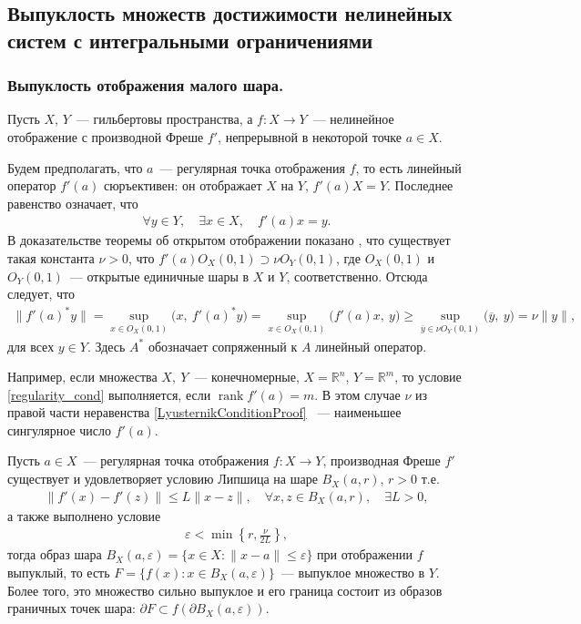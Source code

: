 \documentclass[../main.tex]{subfiles}
\begin{document}
	\subsection{Выпуклость множеств достижимости нелинейных систем с интегральными ограничениями}
	\subsubsection{Выпуклость отображения малого шара.}
	
	Пусть $X$, $Y$~--- гильбертовы пространства, а $f: X \rightarrow Y$~--- нелинейное отображение с производной Фреше $f'$, непрерывной в некоторой точке $a \in X$.
	
	Будем предполагать, что $a$~--- регулярная точка отображения $f$, то есть линейный оператор $f'(a)$ сюръективен: он отображает $X$ на $Y$, $ f'(a) X = Y $.  Последнее равенство означает, что 
	\begin{gather}\label{regularity_cond}
		\forall y \in Y, \quad \exists x \in X, \quad f'(a) x = y.
	\end{gather}
	В доказательстве теоремы об открытом отображении показано \cite[Теорема 2.11, Теорема 4.13]{Rudin}, что существует такая константа $\nu > 0$, что $f'(a) O_X(0, 1) \supset \nu O_Y(0, 1)$, где $ O_X(0, 1)$ и  $O_Y(0, 1)$~--- открытые единичные шары в $X$ и $Y$, соответственно. Отсюда следует, что
	\begin{gather}\label{LyusternikConditionProof}
		\| f'(a)^* y \| = \sup\limits_{x \in O_X(0, 1)} \big(x,\  f'(a)^* y\big) =  \sup\limits_{x \in O_X(0, 1)} \big(f'(a) x,\  y\big) \geqslant  \sup\limits_{\overline{y} \in \nu O_Y(0, 1)} \big(\overline{y},\  y\big) = \nu \|y\|,
	\end{gather}
	для всех $y \in Y$. Здесь $A^*$ обозначает сопряженный к $A$ линейный оператор.
	
	Например, если множества $X,\ Y$~--- конечномерные, $X = \mathbb{R}^n$, $Y = \mathbb{R}^m$, то условие \eqref{regularity_cond} выполняется, если  $ \operatorname{rank} f'(a) = m$. В этом случае $\nu$ из правой части неравенства \eqref{LyusternikConditionProof} ~--- наименьшее сингулярное число $f'(a)$. 
	\begin{theorem}\label{PolyakTh}
		Пусть $a \in X$~--- регулярная точка отображения $f: X \rightarrow Y$, производная Фреше $f'$ существует и удовлетворяет условию Липшица на шаре  $B_X(a,r) $, $r > 0$  т.е. 
		\begin{gather}\label{lip_cond}
			\| f'(x) - f'(z) \| \leqslant L \| x - z \|, \quad \forall x,z \in B_X(a,r), \quad \exists L > 0,
		\end{gather}
		а также выполнено условие
		\begin{gather}
			\varepsilon < \min\left\{r,\frac{\nu}{2L}\right\},
		\end{gather}
		тогда образ шара $B_X(a,\varepsilon) = \{x \in X: \| x - a\| \leqslant \varepsilon\}$ при отображении $f$ выпуклый, то есть $F = 
		\{f(x): x \in B_X(a,\varepsilon)\}$~--- выпуклое множество в $Y$. Более того, это множество сильно выпуклое и его граница состоит из образов граничных точек шара: $\partial F \subset f(\partial B_X(a,\varepsilon))$.
	\end{theorem}
	
\end{document}
